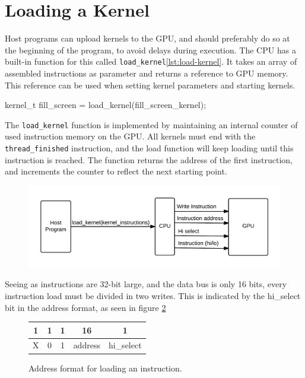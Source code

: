 \section{Loading a Kernel}
Host programs can upload kernels to the GPU, and should preferably do so at the beginning of the program, to avoid delays during execution.
The CPU has a built-in function for this called \verb/load_kernel/\ref{lst:load-kernel}.
It takes an array of assembled instructions as parameter and returns a reference to GPU memory.
This reference can be used when setting kernel parameters and starting kernels.

\begin{c-code}[caption=The load\_kernel function call, label=lst:load-kernel]
kernel_t fill_screen = load_kernel(fill_screen_kernel);
\end{c-code}

The \verb/load_kernel/ function is implemented by maintaining an internal counter of used instruction memory on the GPU.
All kernels must end with the \verb/thread_finished/ instruction,
and the load function will keep loading until this instruction is reached.
The function returns the address of the first instruction, and increments the counter to reflect the next starting point.

\begin{figure}[H]
    \centering
    \includegraphics[width=\textwidth]{../cpu/diagrams/loading_a_kernel.png}
    \caption{}
    \label{fig:loading_a_kernel}
\end{figure}

Seeing as instructions are 32-bit large, and the data bus is only 16 bits,
every instruction load must be divided in two writes.
This is indicated by the hi\_select bit in the address format, as seen in figure \ref{fig:load_instruction_format}

\begin{figure}[H]
    \centering
    \begin{tabular}{|c|c|c|c|c|}
    \multicolumn{1}{c}{1} & \multicolumn{1}{c}{1} & \multicolumn{1}{c}{1} & \multicolumn{1}{c}{16}  & \multicolumn{1}{c}{1} \\ \hline
    X & 0 & 1 & address & hi\_select \\ \hline
    \end{tabular}
    \caption{Address format for loading an instruction.}
    \label{fig:load_instruction_format}
\end{figure}
